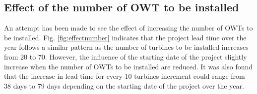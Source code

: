 \subsection{Effect of the number of OWT to be installed}

An attempt has been made to see the effect of increasing the number of OWTs to be installed. Fig. \ref{fig:effectnumber} indicates that the project lead time over the year follows a similar pattern as the number of turbines to be installed increases from 20 to 70. However, the influence of the starting date of the project slightly increase when the number of OWTs to be installed are reduced. It was also found that the increase in lead time for every 10 turbines increment could range from 38 days to 79 days depending on the starting date of the project over the year.  
